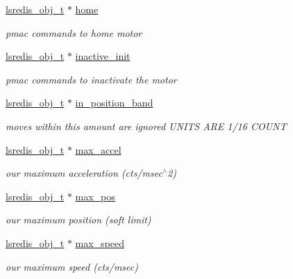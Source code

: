 \begin{DoxyCompactItemize}
\hyperlink{pgpmac_8h_ad449de06d02791adf2498d2a1e1f909c}{lsredis\-\_\-obj\-\_\-t} $\ast$ \hyperlink{structlspmac__motor__struct_a6dc1ceab86687f741d4c4a574501959c}{home}
\begin{DoxyCompactList}\small\item\em pmac commands to home motor \end{DoxyCompactList}\item 
\hyperlink{pgpmac_8h_ad449de06d02791adf2498d2a1e1f909c}{lsredis\-\_\-obj\-\_\-t} $\ast$ \hyperlink{structlspmac__motor__struct_ab329ce9b277eca9984c18417dece7bf7}{inactive\-\_\-init}
\begin{DoxyCompactList}\small\item\em pmac commands to inactivate the motor \end{DoxyCompactList}\item 
\hyperlink{pgpmac_8h_ad449de06d02791adf2498d2a1e1f909c}{lsredis\-\_\-obj\-\_\-t} $\ast$ \hyperlink{structlspmac__motor__struct_a48de72c2442bd5aa9420fcfe6b4f265f}{in\-\_\-position\-\_\-band}
\begin{DoxyCompactList}\small\item\em moves within this amount are ignored U\-N\-I\-T\-S A\-R\-E 1/16 C\-O\-U\-N\-T \end{DoxyCompactList}\item 
\hyperlink{pgpmac_8h_ad449de06d02791adf2498d2a1e1f909c}{lsredis\-\_\-obj\-\_\-t} $\ast$ \hyperlink{structlspmac__motor__struct_a50cf4c0711cea164e332bc34705a1a68}{max\-\_\-accel}
\begin{DoxyCompactList}\small\item\em our maximum acceleration (cts/msec$^\wedge$2) \end{DoxyCompactList}\item 
\hyperlink{pgpmac_8h_ad449de06d02791adf2498d2a1e1f909c}{lsredis\-\_\-obj\-\_\-t} $\ast$ \hyperlink{structlspmac__motor__struct_aac8c31a857910cdcbb409331e128e766}{max\-\_\-pos}
\begin{DoxyCompactList}\small\item\em our maximum position (soft limit) \end{DoxyCompactList}\item 
\hyperlink{pgpmac_8h_ad449de06d02791adf2498d2a1e1f909c}{lsredis\-\_\-obj\-\_\-t} $\ast$ \hyperlink{structlspmac__motor__struct_a69e49769a1001665377efc7193d88a0a}{max\-\_\-speed}
\begin{DoxyCompactList}\small\item\em our maximum speed (cts/msec) \end{DoxyCompactList}\item 

\end{DoxyCompactItemize}
